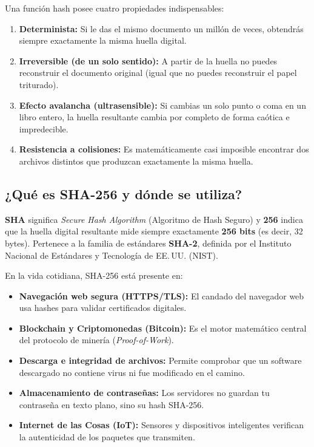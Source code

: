 \documentclass[11pt,a4paper]{article}
\begin{document}
Una función hash posee cuatro propiedades indispensables:
\begin{enumerate}[leftmargin=*]
    \item \textbf{Determinista:} Si le das el mismo documento un millón de veces, obtendrás siempre exactamente la misma huella digital.
    \item \textbf{Irreversible (de un solo sentido):} A partir de la huella no puedes reconstruir el documento original (igual que no puedes reconstruir el papel triturado).
    \item \textbf{Efecto avalancha (ultrasensible):} Si cambias un solo punto o coma en un libro entero, la huella resultante cambia por completo de forma caótica e impredecible.
    \item \textbf{Resistencia a colisiones:} Es matemáticamente casi imposible encontrar dos archivos distintos que produzcan exactamente la misma huella.
\end{enumerate}

\subsection{¿Qué es SHA-256 y dónde se utiliza?}
\textbf{SHA} significa \emph{Secure Hash Algorithm} (Algoritmo de Hash Seguro) y \textbf{256} indica que la huella digital resultante mide siempre exactamente \textbf{256 bits} (es decir, 32 bytes). Pertenece a la familia de estándares \textbf{SHA-2}, definida por el Instituto Nacional de Estándares y Tecnología de EE.\,UU. (NIST).

En la vida cotidiana, SHA-256 está presente en:
\begin{itemize}[leftmargin=*]
    \item \textbf{Navegación web segura (HTTPS/TLS):} El candado del navegador web usa hashes para validar certificados digitales.
    \item \textbf{Blockchain y Criptomonedas (Bitcoin):} Es el motor matemático central del protocolo de minería (\emph{Proof-of-Work}).
    \item \textbf{Descarga e integridad de archivos:} Permite comprobar que un software descargado no contiene virus ni fue modificado en el camino.
    \item \textbf{Almacenamiento de contraseñas:} Los servidores no guardan tu contraseña en texto plano, sino su hash SHA-256.
    \item \textbf{Internet de las Cosas (IoT):} Sensores y dispositivos inteligentes verifican la autenticidad de los paquetes que transmiten.
\end{itemize}
\end{document}
